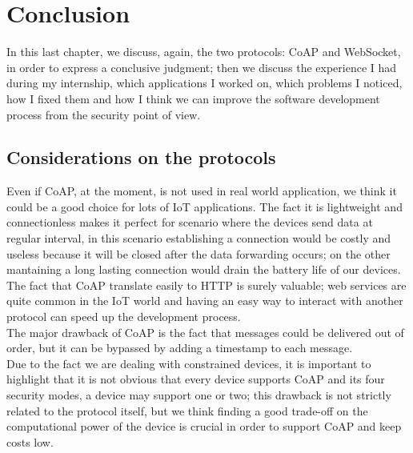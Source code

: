 

\chapter{Conclusion}\label{ch:end}

In this last chapter, we discuss, again, the two protocols: CoAP and WebSocket, in order to express a conclusive judgment; then we discuss the experience I had during my internship, which applications I worked on, which problems I noticed, how I fixed them and how I think we can improve the software development process from the security point of view.

\section{Considerations on the protocols}

Even if CoAP, at the moment, is not used in real world application, we think it could be a good choice for lots of IoT applications. The fact it is lightweight and connectionless makes it perfect for scenario where the devices send data at
regular interval, in this scenario establishing a connection would be costly and useless because it will be closed after the data forwarding occurs; on the other mantaining a long lasting connection would drain the battery life of our devices.\\
The fact that CoAP translate easily to HTTP is surely valuable; web services are quite common in the IoT world and having
an easy way to interact with another protocol can speed up the development process.\\
The major drawback of CoAP is the fact that messages could be delivered out of order, but it can be bypassed by adding a 
timestamp to each message.\\
Due to the fact we are dealing with constrained devices, it is important to highlight that it is not obvious that every device
supports CoAP and its four security modes, a device may support one or two; this drawback is not strictly related to the protocol itself, but we think finding a good trade-off on the computational power of the device is crucial in order to support CoAP and keep costs low.\\

